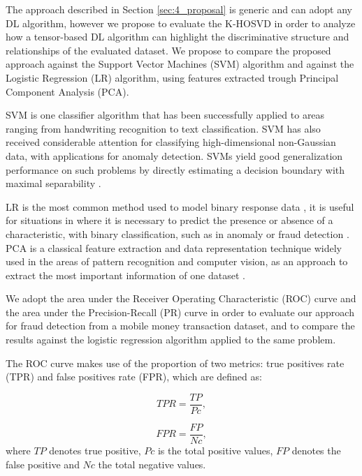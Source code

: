 The approach described in Section \ref{sec:4_proposal} is generic and can adopt any DL algorithm, however we propose to evaluate the K-HOSVD in order to analyze how a tensor-based DL algorithm can highlight the discriminative structure and relationships of the evaluated dataset. We propose to compare the proposed approach against the Support Vector Machines (SVM) algorithm and against the Logistic Regression (LR) algorithm, using features extracted trough Principal Component Analysis (PCA). 

SVM is one classifier algorithm that has been successfully applied to areas ranging from handwriting recognition to text classification. SVM has also received considerable attention for classifying high-dimensional non-Gaussian data, with applications for anomaly detection. SVMs yield good generalization performance on such problems by directly estimating a decision boundary with maximal separability \cite{akbani2004applying, banerjee2006support}. 

LR is the most common method used to model binary response data \cite{hilbe2011logistic}, it is useful for situations in where it is necessary to predict the presence or absence of a characteristic, with binary classification, such as in anomaly or fraud detection \cite{bhattacharyya2011data}. PCA \cite{jolliffe2005principal} is a classical feature extraction and data representation technique widely used in the areas of pattern recognition and computer vision, as an approach to extract the most important information of one dataset \cite{yang2004two}.

We adopt the area under the Receiver Operating Characteristic (ROC) curve and the area under the Precision-Recall (PR) curve in order to evaluate our approach for fraud detection from a mobile money transaction dataset, and to compare the results against the logistic regression algorithm applied to the same problem. 

The ROC curve makes use of the proportion of two metrics: true positives rate (TPR) and false positives rate (FPR), which are defined as:

\begin{equation}\label{eq:4_eq04}
	TPR = \frac{TP}{Pc},
\end{equation}

\begin{equation}\label{eq:4_eq05}
	FPR = \frac{FP}{Nc},
\end{equation}
where $TP$ denotes true positive, $Pc$ is the total positive values, $FP$ denotes the false positive and $Nc$ the total negative values.

